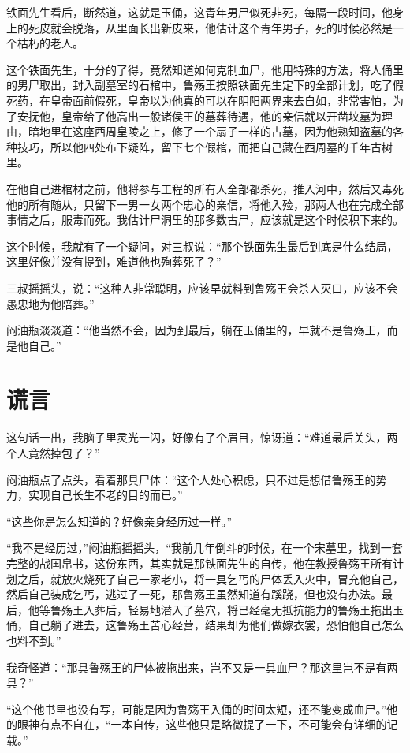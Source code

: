 铁面先生看后，断然道，这就是玉俑，这青年男尸似死非死，每隔一段时间，他身上的死皮就会脱落，从里面长出新皮来，他估计这个青年男子，死的时候必然是一个枯朽的老人。

这个铁面先生，十分的了得，竟然知道如何克制血尸，他用特殊的方法，将人俑里的男尸取出，封入副墓室的石棺中，鲁殇王按照铁面先生定下的全部计划，吃了假死药，在皇帝面前假死，皇帝以为他真的可以在阴阳两界来去自如，非常害怕，为了安抚他，皇帝给了他高出一般诸侯王的墓葬待遇，他的亲信就以开凿坟墓为理由，暗地里在这座西周皇陵之上，修了一个扇子一样的古墓，因为他熟知盗墓的各种技巧，所以他四处布下疑阵，留下七个假棺，而把自己藏在西周墓的千年古树里。

在他自己进棺材之前，他将参与工程的所有人全部都杀死，推入河中，然后又毒死他的所有随从，只留下一男一女两个忠心的亲信，将他入殓，那两人也在完成全部事情之后，服毒而死。我估计尸洞里的那多数古尸，应该就是这个时候积下来的。

这个时候，我就有了一个疑问，对三叔说：“那个铁面先生最后到底是什么结局，这里好像并没有提到，难道他也殉葬死了？”

三叔摇摇头，说：“这种人非常聪明，应该早就料到鲁殇王会杀人灭口，应该不会愚忠地为他陪葬。”

闷油瓶淡淡道：“他当然不会，因为到最后，躺在玉俑里的，早就不是鲁殇王，而是他自己。”

\chapter{谎言}

这句话一出，我脑子里灵光一闪，好像有了个眉目，惊讶道：“难道最后关头，两个人竟然掉包了？”

闷油瓶点了点头，看着那具尸体：“这个人处心积虑，只不过是想借鲁殇王的势力，实现自己长生不老的目的而已。”

“这些你是怎么知道的？好像亲身经历过一样。”

“我不是经历过，”闷油瓶摇摇头，“我前几年倒斗的时候，在一个宋墓里，找到一套完整的战国帛书，这份东西，其实就是那铁面先生的自传，他在教授鲁殇王所有计划之后，就放火烧死了自己一家老小，将一具乞丐的尸体丢入火中，冒充他自己，然后自己装成乞丐，逃过了一死，那鲁殇王虽然知道有蹊跷，但也没有办法。最后，他等鲁殇王入葬后，轻易地潜入了墓穴，将已经毫无抵抗能力的鲁殇王拖出玉俑，自己躺了进去，这鲁殇王苦心经营，结果却为他们做嫁衣裳，恐怕他自己怎么也料不到。”

我奇怪道：“那具鲁殇王的尸体被拖出来，岂不又是一具血尸？那这里岂不是有两具？”

“这个他书里也没有写，可能是因为鲁殇王入俑的时间太短，还不能变成血尸。”他的眼神有点不自在，“一本自传，这些他只是略微提了一下，不可能会有详细的记载。”

